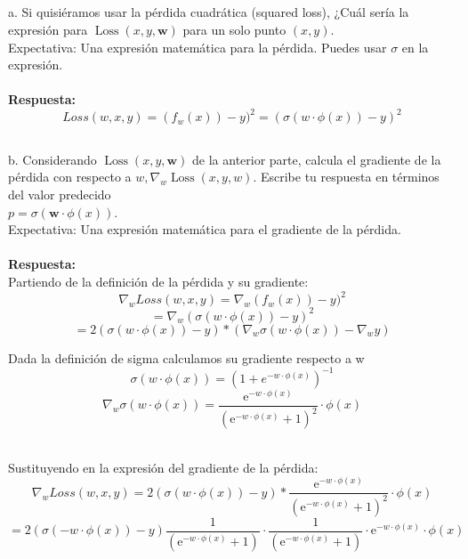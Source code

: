 \documentclass{article}
\begin{document}
 \subsection{}
a. Si quisiéramos usar la pérdida cuadrática (squared loss), ¿Cuál sería la expresión para $\operatorname{Loss}(x, y, \boldsymbol{w})$ para un solo punto $(x, y)$.\\
Expectativa: Una expresión matemática para la pérdida. Puedes usar $\sigma$ en la expresión.\\

\\\textbf{Respuesta:}\\
\[ Loss(w,x,y)
= (f_w(x))-y)^2
=(\sigma(w\cdot\phi(x))-y)^2\]

\subsection{}
b. Considerando $\operatorname{Loss}(x, y, \boldsymbol{w})$ de la anterior parte, calcula el gradiente de la pérdida con respecto a $w, \nabla_w \operatorname{Loss}(x, y, w)$. Escribe tu respuesta en términos del valor predecido \\
$p=\sigma(\boldsymbol{w} \cdot \phi(x))$.\\

Expectativa: Una expresión matemática para el gradiente de la pérdida.\\

\\\textbf{Respuesta:}\\


Partiendo de la definición de la pérdida y su gradiente:
\\
\[\nabla_w Loss(w,x,y) =\nabla_w (f_w(x))-y)^2 \]
\[=\nabla_w (\sigma(w\cdot\phi(x))-y)^2\]
\[=2(\sigma(w\cdot\phi(x))-y)* (\nabla_w \sigma(w\cdot\phi(x))- \nabla_w y)\]


 Dada la definición de sigma calculamos su gradiente respecto a w\\
\[\sigma(w\cdot \phi(x))=\left(1+e^{-w\cdot \phi(x)}\right)^{-1}\] 
\[\nabla_w \sigma(w\cdot \phi(x))
=\dfrac{\mathrm{e}^{-w\cdot \phi(x)}}{\left(\mathrm{e}^{-w\cdot \phi(x)}+1\right)^2} \cdot \phi(x)\]

\\
Sustituyendo en la expresión del gradiente de la pérdida:
\[\nabla_w Loss(w,x,y)=2(\sigma(w\cdot\phi(x))-y)*\dfrac{\mathrm{e}^{-w\cdot \phi(x)}}{\left(\mathrm{e}^{-w\cdot \phi(x)}+1\right)^2}\cdot \phi(x) \]
\[=2(\sigma(-w\cdot\phi(x))-y)\dfrac{1}{\left(\mathrm{e}^{-w\cdot \phi(x)}+1\right)}\cdot \dfrac{1}{\left(\mathrm{e}^{-w\cdot \phi(x)}+1\right)}\cdot \mathrm{e}^{-w\cdot \phi(x)}\cdot \phi(x) \]
\end{document}
